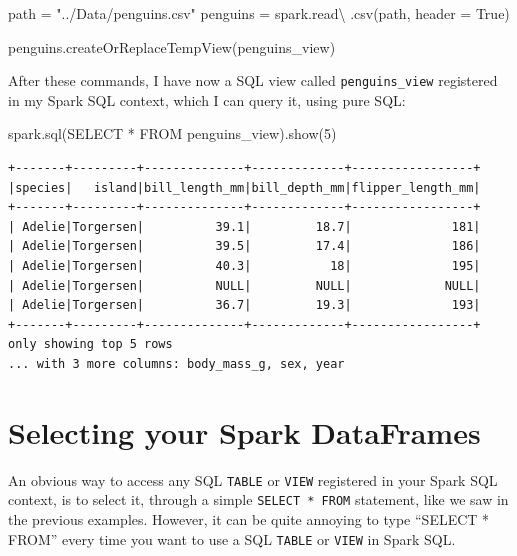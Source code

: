 \documentclass[
  11pt,
  letterpaper,
  DIV=11,
  numbers=noendperiod]{scrreprt}
\newenvironment{Shaded}{\begin{snugshade}}{\end{snugshade}}
\newcommand{\DecValTok}[1]{\textcolor[rgb]{0.68,0.00,0.00}{#1}}
\newcommand{\NormalTok}[1]{\textcolor[rgb]{0.00,0.23,0.31}{#1}}
\newcommand{\OperatorTok}[1]{\textcolor[rgb]{0.37,0.37,0.37}{#1}}
\newcommand{\StringTok}[1]{\textcolor[rgb]{0.13,0.47,0.30}{#1}}
\newcommand{\VariableTok}[1]{\textcolor[rgb]{0.07,0.07,0.07}{#1}}
\begin{document}
\begin{Shaded}
\begin{Highlighting}[]
\NormalTok{path }\OperatorTok{=} \StringTok{"../Data/penguins.csv"}
\NormalTok{penguins }\OperatorTok{=}\NormalTok{ spark.read}\OperatorTok{\textbackslash{}}
\NormalTok{  .csv(path, header }\OperatorTok{=} \VariableTok{True}\NormalTok{)}
  
\NormalTok{penguins.createOrReplaceTempView(}\StringTok{\textquotesingle{}penguins\_view\textquotesingle{}}\NormalTok{)}
\end{Highlighting}
\end{Shaded}

After these commands, I have now a SQL view called
\texttt{penguins\_view} registered in my Spark SQL context, which I can
query it, using pure SQL:

\begin{Shaded}
\begin{Highlighting}[]
\NormalTok{spark.sql(}\StringTok{\textquotesingle{}SELECT * FROM penguins\_view\textquotesingle{}}\NormalTok{).show(}\DecValTok{5}\NormalTok{)}
\end{Highlighting}
\end{Shaded}

\begin{verbatim}
+-------+---------+--------------+-------------+-----------------+
|species|   island|bill_length_mm|bill_depth_mm|flipper_length_mm|
+-------+---------+--------------+-------------+-----------------+
| Adelie|Torgersen|          39.1|         18.7|              181|
| Adelie|Torgersen|          39.5|         17.4|              186|
| Adelie|Torgersen|          40.3|           18|              195|
| Adelie|Torgersen|          NULL|         NULL|             NULL|
| Adelie|Torgersen|          36.7|         19.3|              193|
+-------+---------+--------------+-------------+-----------------+
only showing top 5 rows
... with 3 more columns: body_mass_g, sex, year
\end{verbatim}

\section{Selecting your Spark
DataFrames}\label{selecting-your-spark-dataframes}

An obvious way to access any SQL \texttt{TABLE} or \texttt{VIEW}
registered in your Spark SQL context, is to select it, through a simple
\texttt{SELECT\ *\ FROM} statement, like we saw in the previous
examples. However, it can be quite annoying to type ``SELECT * FROM''
every time you want to use a SQL \texttt{TABLE} or \texttt{VIEW} in
Spark SQL.
\end{document}

